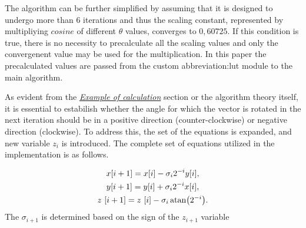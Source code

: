 \documentclass[a4paper, twoside, 11pt]{article}
\begin{document}
            The algorithm can be further simplified by assuming that it is designed to undergo more than 6 iterations and thus the scaling constant, represented by multipliying $cosine$ of different $\theta$ values, converges to $0,60725$. If this condition is true, there is no necessity to precalculate all the scaling values and only the convergenent value may be used for the multiplication. In this paper the precalculated values are passed from the custom \gls{abbreviation:lut} module to the main algorithm.\par
            As evident from the \hyperref[subsubsec:example-of-calculation]{\textit{Example of calculation}} section or the algorithm theory itself, it is essential to estabilish whether the angle for which the vector is rotated in the next iteration should be in a positive direction (counter-clockwise) or negative direction (clockwise). To address this, the set of the equations is expanded, and new variable $z_i$ is introduced. The complete set of equations utilized in the implementation is as follows.

            \begin{equation}
                \begin{gathered}
                x [i+1] = x [i] - \sigma_i 2^{-i} y[i],\\
                y [i+1] = y [i] + \sigma_i 2^{-i} x[i],\\
                z~[i+1] = z~[i] - \sigma_i \atan (2^{-i}).
                \end{gathered}
            \end{equation}
            The $\sigma_{i+1}$ is determined based on the sign of the $z_{i+1}$ variable
\end{document}
